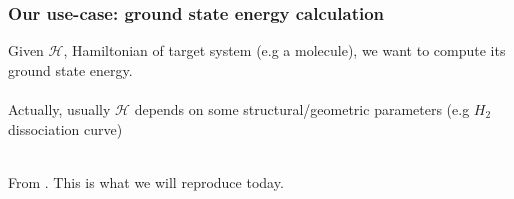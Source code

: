\documentclass{beamer}
\begin{document}
\begin{frame}
\frametitle{Our use-case: ground state energy calculation}
Given $\mathcal{H}$, Hamiltonian of target system (e.g a molecule), we want to compute its ground state energy.\\~\\
Actually, usually $\mathcal{H}$ depends on some structural/geometric parameters (e.g $H_{2}$ dissociation curve)\\~\\
\begin{center}
\end{center}

From \textcolor{blue}{\cite{o2016scalable}}. This is what we will reproduce today.
\end{frame}
\end{document}
